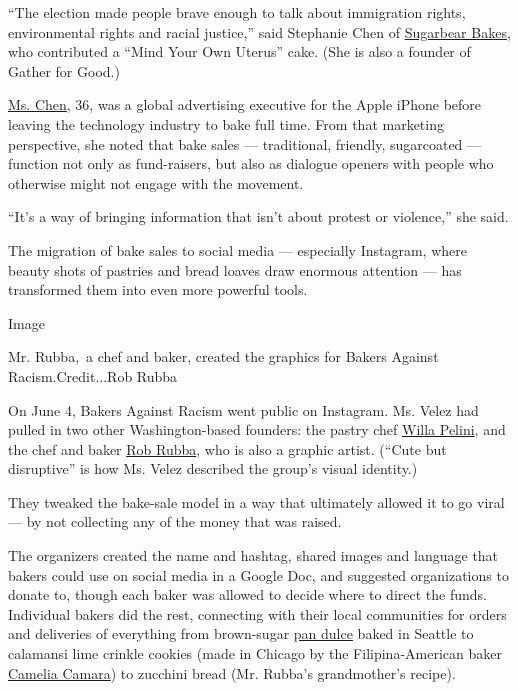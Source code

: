 ``The election made people brave enough to talk about immigration
rights, environmental rights and racial justice,'' said Stephanie Chen
of \href{http://www.sugarbearbakes.com/}{Sugarbear Bakes}, who
contributed a ``Mind Your Own Uterus'' cake. (She is also a founder of
Gather for Good.)

\href{https://www.instagram.com/sugarbearbakes/?hl=en}{Ms. Chen}, 36,
was a global advertising executive for the Apple iPhone before leaving
the technology industry to bake full time. From that marketing
perspective, she noted that bake sales --- traditional, friendly,
sugarcoated --- function not only as fund-raisers, but also as dialogue
openers with people who otherwise might not engage with the movement.

``It's a way of bringing information that isn't about protest or
violence,'' she said.

The migration of bake sales to social media --- especially Instagram,
where beauty shots of pastries and bread loaves draw enormous attention
--- has transformed them into even more powerful tools.

Image

Mr. Rubba,~a chef and baker, created the graphics for Bakers Against
Racism.Credit...Rob Rubba

On June 4, Bakers Against Racism went public on Instagram. Ms. Velez had
pulled in two other Washington-based founders: the pastry chef
\href{https://www.instagram.com/badwolf_88/?hl=en}{Willa Pelini}, and
the chef and baker \href{https://www.instagram.com/robrubba/?hl=en}{Rob
Rubba}, who is also a graphic artist. (``Cute but disruptive'' is how
Ms. Velez described the group's visual identity.)

They tweaked the bake-sale model in a way that ultimately allowed it to
go viral --- by not collecting any of the money that was raised.

The organizers created the name and hashtag, shared images and language
that bakers could use on social media in a Google Doc, and suggested
organizations to donate to, though each baker was allowed to decide
where to direct the funds. Individual bakers did the rest, connecting
with their local communities for orders and deliveries of everything
from brown-sugar
\href{https://www.selvacentralgoods.com/baked-goods}{pan dulce} baked in
Seattle to calamansi lime crinkle cookies (made in Chicago by the
Filipina-American baker
\href{https://www.instagram.com/cameliabakes/?hl=en}{Camelia Camara}) to
zucchini bread (Mr. Rubba's grandmother's recipe).

